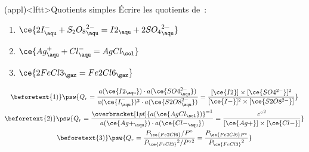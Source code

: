 \documentclass[../../main/main.tex]{subfiles}
\begin{document}
\begin{tcb}[label=exem:qr, sidebyside, righthand ratio=.60]
	(appl)<lftt>{Quotients simples}
	Écrire les quotients de~:
	\begin{enumerate}
		\item $\ce{2I^-_{\aqu} + {S_2O_8}^{2-}_{\aqu} = I2_{\aqu}
			      +2{SO_4}^{2-}_{\aqu}}$
		\item $\ce{Ag^+_{\aqu} + Cl^-_{\aqu} = AgCl_{\sol}}$
		\item $\ce{2FeCl3_{\gaz} = Fe2Cl6_{\gaz}}$
	\end{enumerate}
	\tcblower
	\begin{gather*}
		\beforetext{1)}
		\psw{%
		Q_r = \frac{
		a (\ce{I2_{\aqu}}) \cdot a (\ce{SO4^{2-}_{\aqu}})
		}{
		a (\ce{I^-_{\aqu}})^{2} \cdot a (\ce{S2O8^{2-}_{\aqu}})
		} =
		\frac{
			[\ce{I2}]\times[\ce{SO4^{2-}}]^2
		}{
			[\ce{I-}]^2\times [\ce{S2O8^{2-}}]
		}%
		}%
		\\
		\beforetext{2)}
		\psw{%
		Q_r = \frac{
		\overbracket[1pt]{a (\ce{AgCl_{\sol}})}^{=1}
		}{
		a (\ce{Ag+_{\aqu}}) \cdot a (\ce{Cl-_{\aqu}})
		}
		=
		\frac{c{^\circ}^2
		}{
			[\ce{Ag+}]\times[\ce{Cl-}]
		}%
		}%
		\\
		\beforetext{3)}
		\psw{%
			Q_r = \frac{P_{\ce{Fe2Cl6}}/P^\circ
			}{
				P_{\ce{FeCl3}}{}^2/P^\circ{}^2}
			=
			\frac{P_{\ce{Fe2Cl6}P^\circ}
			}{
				P_{\ce{FeCl3}}{}^2
			}%
		}%
	\end{gather*}
\end{tcb}
\end{document}
